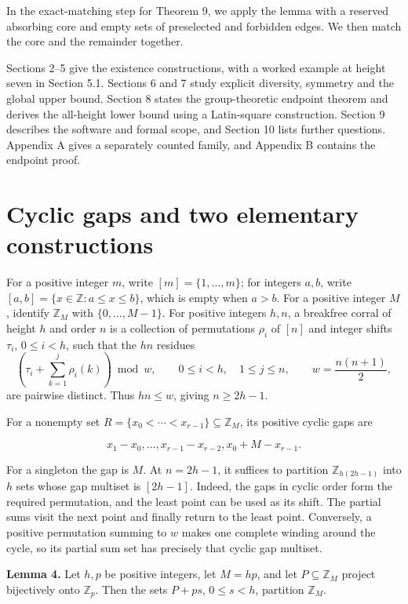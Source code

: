 \documentclass[11pt,a4paper]{article}
\newcommand{\statementstart}{\par\addvspace{6pt plus 1pt minus 1pt}\noindent}
\begin{document}
In the exact-matching step for Theorem 9, we apply the lemma with a reserved absorbing core and empty sets of preselected and forbidden edges. We then match the core and the remainder together.

Sections 2--5 give the existence constructions, with a worked example at height seven in Section 5.1. Sections 6 and 7 study explicit diversity, symmetry and the global upper bound. Section 8 states the group-theoretic endpoint theorem and derives the all-height lower bound using a Latin-square construction. Section 9 describes the software and formal scope, and Section 10 lists further questions. Appendix A gives a separately counted family, and Appendix B contains the endpoint proof.

\hypertarget{cyclic-gaps-and-two-elementary-constructions}{%
\section{Cyclic gaps and two elementary constructions}\label{cyclic-gaps-and-two-elementary-constructions}}

For a positive integer \(m\), write \([m]=\{1,\ldots,m\}\); for integers \(a,b\), write \([a,b]=\{x\in\mathbb Z:a\leq x\leq b\}\), which is empty when \(a>b\). For a positive integer \(M\), identify \(\mathbb Z_M\) with \(\{0,\ldots,M-1\}\). For positive integers \(h,n\), a breakfree corral of height \(h\) and order \(n\) is a collection of permutations \(\rho_i\) of \([n]\) and integer shifts \(\tau_i\), \(0\leq i<h\), such that the \(hn\) residues \[
 \left(\tau_i+\sum_{k=1}^{j}\rho_i(k)\right)\bmod w,
 \qquad 0\leq i<h,\quad 1\leq j\leq n,\qquad
 w=\frac{n(n+1)}2,
\] are pairwise distinct. Thus \(hn\leq w\), giving \(n\geq2h-1\).

For a nonempty set \(R=\{x_0<\cdots<x_{r-1}\}\subseteq\mathbb Z_M\), its positive cyclic gaps are

\[
 x_1-x_0,\ldots,x_{r-1}-x_{r-2},x_0+M-x_{r-1}.
\]

For a singleton the gap is \(M\). At \(n=2h-1\), it suffices to partition \(\mathbb Z_{h(2h-1)}\) into \(h\) sets whose gap multiset is \([2h-1]\). Indeed, the gaps in cyclic order form the required permutation, and the least point can be used as its shift. The partial sums visit the next point and finally return to the least point. Conversely, a positive permutation summing to \(w\) makes one complete winding around the cycle, so its partial sum set has precisely that cyclic gap multiset.

\statementstart\textbf{Lemma 4.} Let \(h,p\) be positive integers, let \(M=hp\), and let \(P\subseteq\mathbb Z_M\) project bijectively onto \(\mathbb Z_p\). Then the sets \(P+ps\), \(0\leq s<h\), partition \(\mathbb Z_M\).
\end{document}
